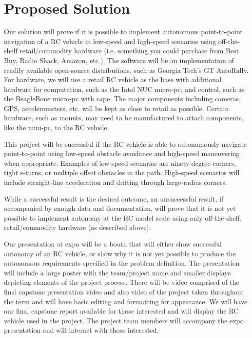 \documentclass[draftclsnofoot,onecolumn,10pt]{IEEEtran}
\begin{document}
\section{Proposed Solution}
Our solution will prove if it is possible to implement autonomous point-to-point
navigation of a RC vehicle in low-speed and high-speed scenarios using
off-the-shelf retail/commodity hardware (i.e. something you could purchase from
Best Buy, Radio Shack, Amazon, etc.).  The software will be an implementation of
readily available open-source distributions, such as Georgia Tech's GT
AutoRally. For hardware, we will use a retail RC vehicle as the base with
additional hardware for computation, such as the Intel NUC micro-pc, and
control, such as the BeagleBone micro-pc with cape. The major components including
cameras, GPS, accelerometers, etc. will be kept as close to retail as possible.
Certain hardware, such as mounts, may need to be manufactured to attach
components, like the mini-pc, to the RC vehicle.\par
This project will be successful if the RC vehicle is able to autonomously
navigate point-to-point using low-speed obstacle avoidance and high-speed
maneuvering when appropriate. Examples of low-speed scenarios are ninety-degree
corners, tight s-turns, or multiple offset obstacles in the path. High-speed
scenarios will include straight-line acceleration and drifting through
large-radius corners.\par
While a successful result is the desired outcome, an unsuccessful result, if 
accompanied by enough data and documentation, will prove that it is not yet 
possible to implement autonomy at the RC model scale using only off-the-shelf, 
retail/commodity hardware (as described above).\par
Our presentation at expo will be a booth that will either show successful
autonomy of an RC vehicle, or show why it is not yet possible to produce the
autonomous requirements specified in the problem definition. The presentation
will include a large poster with the team/project name and smaller displays
depicting elements of the project process. There will be video comprised of the
final capstone presentation video and also video of the project taken throughout
the term and will have basic editing and formatting for appearance. We will have
our final capstone report available for those interested and will display the RC
vehicle used in the project. The project team members will accompany the expo
presentation and will interact with those interested.
\end{document}
